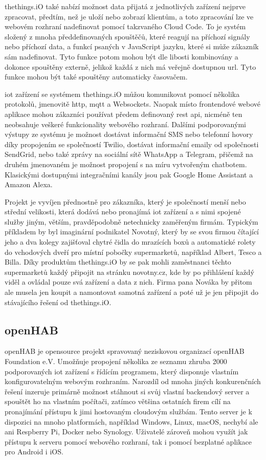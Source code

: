 thethings.iO také nabízí možnost data přijatá z jednotlivých zařízení nejprve zpracovat, předtím, než je uloží nebo zobrazí klientům, a toto zpracování lze ve webovém rozhraní nadefinovat pomocí takzvaného Cloud Code. To je systém složený z mnoha předdefinovaných spouštěčů, které reagují na příchozí signály nebo příchozí data, a funkcí psaných v JavaScript jazyku, které si může zákazník sám nadefinovat. Tyto funkce potom mohou být dle libosti kombinovány a dokonce spouštěny externě, jelikož každá z nich má veřejně dostupnou \acrshort{url}. Tyto funkce mohou být také spouštěny automaticky časovačem.

\acrshort{iot} zařízení se systémem thethings.iO můžou komunikovat pomocí několika protokolů, jmenovitě \acrshort{http}, \acrshort{mqtt} a Websockets. Naopak místo frontendové webové aplikace mohou zákazníci používat předem definovaný \acrshort{rest} \acrshort{api}, nicméně ten neobsahuje veškeré funkcionality webového rozhraní. Dalšími podporovanými výstupy ze systému je možnost dostávat informační SMS nebo telefonní hovory díky propojením se společností Twilio, dostávat informační emaily od společnosti SendGrid, nebo také zprávy na sociální sítě WhatsApp a Telegram, přičemž na druhém jmenovaném je možnost propojení s na míru vytvořeným chatbotem. Klasickými dostupnými integračními kanály jsou pak Google Home Assistant a Amazon Alexa.

Projekt je vyvíjen přednostně pro zákazníka, který je společností menší nebo střední velikosti, která dodává nebo pronajímá \acrshort{iot} zařízení a s nimi spojené služby jiným, větším, pravděpodobně netechnicky zaměřeným firmám. Typickým příkladem by byl imaginární podnikatel Novotný, který by se svou firmou čítající jeho a dva kolegy zajišťoval chytré čidla do mrazících boxů a automatické rolety do vchodových dveří pro místní pobočky supermarketů, například Albert, Tesco a Billa. Díky produktům thethings.iO by se pak mohli zaměstnanci těchto supermarketů každý připojit na stránku novotny.cz, kde by po přihlášení každý viděl a ovládal pouze svá zařízení a data z nich. Firma pana Nováka by přitom ale musela jen koupit a namontovat samotná zařízení a poté už je jen připojit do stávajícího řešení od thethings.iO. 

\subsection{openHAB}

openHAB je opensource projekt spravovaný neziskovou organizací openHAB Foundation e.V. Umožňuje propojení několika ze seznamu zhruba 2000 podporovaných \acrshort{iot} zařízení s řídícím programem, který disponuje vlastním konfigurovatelným webovým rozhraním. Narozdíl od mnoha jiných konkurenčních řešení inzeruje primárně možnost stáhnout si svůj vlastní backendový server a spouštět ho na vlastním počítači, zatímco většina ostatních firem cílí na pronajímání přístupu k jimi hostovaným cloudovým službám. Tento server je k dispozici na mnoho platformách, například Windows, Linux, macOS, nechybí ale ani Respberry Pi, Docker nebo Synology. Uživatelé zároveň mohou využít jak přístupu k serveru pomocí webového rozhraní, tak i pomocí bezplatné aplikace pro Android i iOS. 

